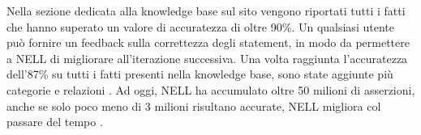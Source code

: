 
\noindent Nella sezione dedicata alla knowledge base sul sito vengono riportati tutti i fatti che hanno superato un valore di accuratezza di oltre 90\%.\newline
Un qualsiasi utente può fornire un feedback sulla correttezza degli statement, in modo da permettere a NELL di migliorare all'iterazione successiva.
Una volta raggiunta l'accuratezza dell'87\% su tutti i fatti presenti nella knowledge base, sono state aggiunte più categorie e relazioni \cite{ReadtheWebOverview:online}.
Ad oggi, NELL ha accumulato oltre 50 milioni di asserzioni, anche se solo poco meno di 3 milioni risultano accurate, NELL migliora col passare del tempo \cite{ReadtheWeb:online}.
\newpage